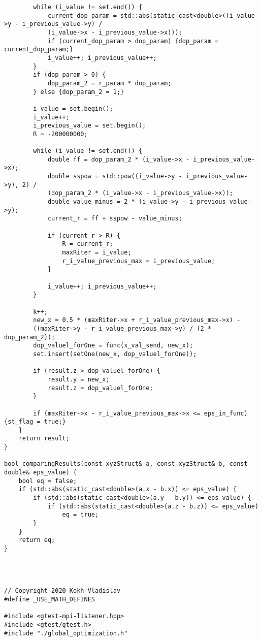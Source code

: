 \documentclass{report}
\begin{document}
\begin{lstlisting}
        while (i_value != set.end()) {
            current_dop_param = std::abs(static_cast<double>((i_value->y - i_previous_value->y) /
            (i_value->x - i_previous_value->x)));
            if (current_dop_param > dop_param) {dop_param = current_dop_param;}
            i_value++; i_previous_value++;
        }
        if (dop_param > 0) {
            dop_param_2 = r_param * dop_param;
        } else {dop_param_2 = 1;}

        i_value = set.begin();
        i_value++;
        i_previous_value = set.begin();
        R = -200000000;

        while (i_value != set.end()) {
            double ff = dop_param_2 * (i_value->x - i_previous_value->x);
            double sspow = std::pow((i_value->y - i_previous_value->y), 2) /
            (dop_param_2 * (i_value->x - i_previous_value->x));
            double value_minus = 2 * (i_value->y - i_previous_value->y);
            current_r = ff + sspow - value_minus;

            if (current_r > R) {
                R = current_r;
                maxRiter = i_value;
                r_i_value_previous_max = i_previous_value;
            }

            i_value++; i_previous_value++;
        }

        k++;
        new_x = 0.5 * (maxRiter->x + r_i_value_previous_max->x) -
        ((maxRiter->y - r_i_value_previous_max->y) / (2 * dop_param_2));
        dop_valuel_forOne = func(x_val_send, new_x);
        set.insert(setOne(new_x, dop_valuel_forOne));

        if (result.z > dop_valuel_forOne) {
            result.y = new_x;
            result.z = dop_valuel_forOne;
        }

        if (maxRiter->x - r_i_value_previous_max->x <= eps_in_func) {st_flag = true;}
    }
    return result;
}

bool comparingResults(const xyzStruct& a, const xyzStruct& b, const double& eps_value) {
    bool eq = false;
    if (std::abs(static_cast<double>(a.x - b.x)) <= eps_value) {
        if (std::abs(static_cast<double>(a.y - b.y)) <= eps_value) {
            if (std::abs(static_cast<double>(a.z - b.z)) <= eps_value)
                eq = true;
        }
    }
    return eq;
}




// Copyright 2020 Kokh Vladislav
#define _USE_MATH_DEFINES

#include <gtest-mpi-listener.hpp>
#include <gtest/gtest.h>
#include "./global_optimization.h"



\end{lstlisting}
\end{document}
